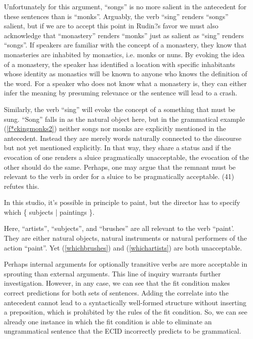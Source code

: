 \documentclass{turabian-researchpaper}
\begin{document}
Unfortunately for this argument, ``songs'' is no more salient in the antecedent for these sentences than is ``monks''. Arguably, the verb ``sing'' renders ``songs'' salient, but if we are to accept this point in Rudin?s favor we must also acknowledge that ``monastery'' renders ``monks'' just as salient as ``sing'' renders ``songs''. If speakers are familiar with the concept of a monastery, they know that monasteries are inhabited by monastics, i.e. monks or nuns. By evoking the idea of a monastery, the speaker has identified a location with specific inhabitants whose identity as monastics will be known to anyone who knows the definition of the word. For a speaker who does not know what a monastery is, they can either infer the meaning by presuming relevance or the sentence will lead to a crash. 

Similarly, the verb ``sing'' will evoke the concept of a something that must be sung. ``Song'' falls in as the natural object here, but in the grammatical example (\ref{f*ckingmonks2}) neither songs nor monks are explicitly mentioned in the antecedent. Instead they are merely words naturally connected to the discourse but not yet mentioned explicitly. In that way, they share a status and if the evocation of one renders a sluice pragmatically unacceptable, the evocation of the other should do the same. Perhaps, one may argue that the remnant must be relevant to the verb in order for a sluice to be pragmatically acceptable. (41) refutes this.

\begin{exe}
\ex\label{inthisstudio}
\begin{xlist}
\ex \label{whichsubjects} In this studio, it's possible in principle to paint, but the director has to specify which \{ subjects | paintings \}. 
 \end{xlist}
 \end{exe}

Here, ``artists'', ``subjects'', and ``brushes'' are all relevant to the verb ``paint'. They are either natural objects, natural instruments or natural performers of the action ``paint''. Yet  (\ref{whichbrushes}) and (\ref{whichartists}) are both unacceptable. 

Perhaps internal arguments for optionally transitive verbs are more acceptable in sprouting than external arguments. This line of inquiry warrants further investigation. However, in any case, we can see that the fit condition makes correct predictions for both sets of sentences.  Adding the correlate into the antecedent cannot lead to a syntactically well-formed structure without inserting a preposition, which is prohibited by the rules of the fit condition. So, we can see already one instance in which the fit condition is able to eliminate an ungrammatical sentence that the ECID incorrectly predicts to be grammatical.    
\end{document}
